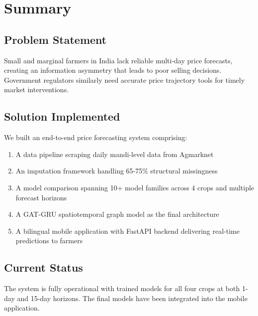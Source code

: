 \documentclass[conference]{IEEEtran}
\begin{document}
\section{Summary}

\subsection{Problem Statement}

Small and marginal farmers in India lack reliable multi-day price forecasts, creating an information asymmetry that leads to poor selling decisions. Government regulators similarly need accurate price trajectory tools for timely market interventions.

\subsection{Solution Implemented}

We built an end-to-end price forecasting system comprising:

\begin{enumerate}
\item A data pipeline scraping daily mandi-level data from Agmarknet
\item An imputation framework handling 65-75\% structural missingness
\item A model comparison spanning 10+ model families across 4 crops and multiple forecast horizons
\item A GAT-GRU spatiotemporal graph model as the final architecture
\item A bilingual mobile application with FastAPI backend delivering real-time predictions to farmers
\end{enumerate}

\subsection{Current Status}

The system is fully operational with trained models for all four crops at both 1-day and 15-day horizons. The final models have been integrated into the mobile application.
\end{document}
